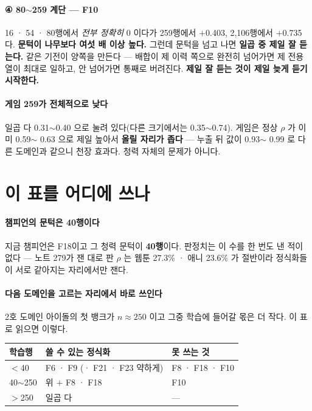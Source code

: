 \documentclass[10pt]{article}
\begin{document}
\paragraph{④ 80$\sim$259 계단 --- F10} 16 · 54 · 80행에서 \emph{전부 정확히}
0 이다가 259행에서 $+$0.403, 2,106행에서 $+$0.735 다. \textbf{문턱이 나무보다
여섯 배 이상 높다.} 그런데 문턱을 넘고 나면 \textbf{일곱 중 제일 잘 듣는다.}
같은 기전이 양쪽을 만든다 --- 배합이 제 이력 쪽으로 완전히 넘어가면 제
전용 열이 최대로 일하고, 안 넘어가면 통째로 버려진다. \textbf{제일 잘 듣는
것이 제일 늦게 듣기 시작한다.}

\paragraph{게임 259가 전체적으로 낮다} 일곱 다 0.31$\sim$0.40 으로 눌려
있다(다른 크기에서는 0.35$\sim$0.74). 게임은 정상 $\rho$ 가 이미 0.59$\sim$
0.63 으로 제일 높아서 \textbf{올릴 자리가 좁다} --- 누출 뒤 값이 0.93$\sim$
0.99 로 다른 도메인과 같으니 천장 효과다. 청력 자체의 문제가 아니다.

\section{이 표를 어디에 쓰나}

\paragraph{챔피언의 문턱은 40행이다} 지금 챔피언은 F18이고 그 청력 문턱이
\textbf{40행}이다. 판정치는 이 수를 한 번도 낸 적이 없다 --- 노트 279가
잰 대로 판 $\rho$ 는 웹툰 27.3\% · 애니 23.6\% 가 절반이라 정식화들이
서로 같아지는 자리에서만 잰다.

\paragraph{다음 도메인을 고르는 자리에서 바로 쓰인다} 2호 도메인 아이돌의
첫 뱅크가 $n{\approx}250$ 이고 그중 학습에 들어갈 몫은 더 작다. 이 표로
읽으면 이렇다.

\begin{center}\small
\begin{tabular}{lll}
\hline
학습행 & 쓸 수 있는 정식화 & 못 쓰는 것 \\
\hline
$<$40 & F6 · F9 (· F21 · F23 약하게) & F8 · F18 · F10 \\
40$\sim$250 & 위 $+$ F8 · F18 & F10 \\
$>$250 & 일곱 다 & --- \\
\hline
\end{tabular}
\end{center}
\end{document}
